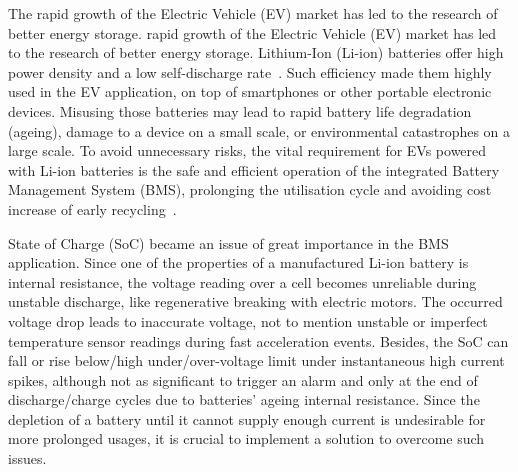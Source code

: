 %
{
The rapid growth of the Electric Vehicle (EV) market has led to the research of better energy storage.
} {
 rapid growth of the Electric Vehicle (EV) market has led to the research of better energy storage.
}
Lithium-Ion (Li-ion) batteries offer high power density and a low self-discharge rate~\cite{han_review, en13082106}.
Such efficiency made them highly used in the EV application, on top of smartphones or other portable electronic devices.
Misusing those batteries may lead to rapid battery life degradation (ageing), damage to a device on a small scale, or environmental catastrophes on a large scale.
To avoid unnecessary risks, the vital requirement for EVs powered with Li-ion batteries is the safe and efficient operation of the integrated Battery Management System (BMS), prolonging the utilisation cycle and avoiding cost increase of early recycling~\cite{skeete_beyond_2020}.

%
State of Charge (SoC) became an issue of great importance in the BMS application.
Since one of the properties of a manufactured Li-ion battery is internal resistance, the voltage reading over a cell becomes unreliable during unstable discharge, like regenerative breaking with electric motors.
The occurred voltage drop leads to inaccurate voltage, not to mention unstable or imperfect temperature sensor readings during fast acceleration events.
Besides, the SoC can fall or rise below/high under/over-voltage limit under instantaneous high current spikes, although not as significant to trigger an alarm and only at the end of discharge/charge cycles due to batteries' ageing internal resistance.
Since the depletion of a battery until it cannot supply enough current is undesirable for more prolonged usages, it is crucial to implement a solution to overcome such issues.


